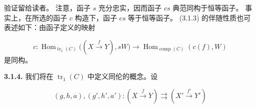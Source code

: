 验证留给读者。
注意，函子 $s$ 充分忠实，因而函子 $cs$ 典范同构于恒等函子。
事实上，在所选的函子 $c$ 构造下，函子 $cs$ 等于恒等函子。
(3.1.3) 的伴随性质也可表述如下：由函子定义的映射

\begin{equation*}
  c\colon
  \operatorname{Hom}_{\operatorname{tr}_1(C)}
    \bigl((X\xrightarrow{f}Y),sW\bigr)
  \longrightarrow
  \operatorname{Hom}_{\operatorname{comp}(C)}(c(f),W)
\end{equation*}
是同构。

\noindent\textbf{3.1.4.}\quad
我们将在 $\operatorname{tr}_1(C)$ 中定义同伦的概念。设

\begin{equation*}
  (g,h,a),(g',h',a')\colon
  (X\xrightarrow{f}Y)
  \rightrightarrows
  (X'\xrightarrow{f'}Y')
\end{equation*}
